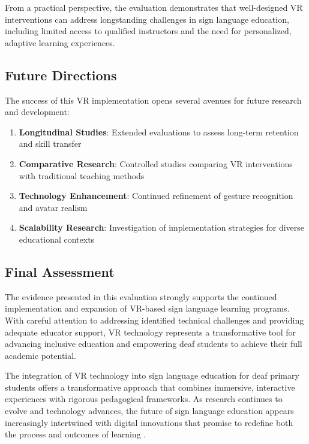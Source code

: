 \documentclass[12pt,a4paper]{article}
\begin{document}
From a practical perspective, the evaluation demonstrates that well-designed VR interventions can address longstanding challenges in sign language education, including limited access to qualified instructors and the need for personalized, adaptive learning experiences.

\subsection{Future Directions}

The success of this VR implementation opens several avenues for future research and development:

\begin{enumerate}
    \item \textbf{Longitudinal Studies}: Extended evaluations to assess long-term retention and skill transfer
    \item \textbf{Comparative Research}: Controlled studies comparing VR interventions with traditional teaching methods
    \item \textbf{Technology Enhancement}: Continued refinement of gesture recognition and avatar realism
    \item \textbf{Scalability Research}: Investigation of implementation strategies for diverse educational contexts
\end{enumerate}

\subsection{Final Assessment}

The evidence presented in this evaluation strongly supports the continued implementation and expansion of VR-based sign language learning programs. With careful attention to addressing identified technical challenges and providing adequate educator support, VR technology represents a transformative tool for advancing inclusive education and empowering deaf students to achieve their full academic potential.

The integration of VR technology into sign language education for deaf primary students offers a transformative approach that combines immersive, interactive experiences with rigorous pedagogical frameworks. As research continues to evolve and technology advances, the future of sign language education appears increasingly intertwined with digital innovations that promise to redefine both the process and outcomes of learning \citep{xie2022virtual}.
\end{document}
